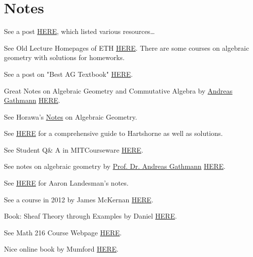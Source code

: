 \section{Notes}

See a post \href{https://math.stackexchange.com/questions/1678780/hartshorne-or-vakils-notes}{HERE}, which listed various resources\dots

See Old Lecture Homepages of ETH \href{https://www2.math.ethz.ch/education/bachelor/lectures.html}{HERE}. There are some courses on algebraic geometry with solutions for homeworks.

See a post on "Best AG Textbook" \href{https://math.stackexchange.com/questions/998/best-algebraic-geometry-text-book-other-than-hartshorne#:~:text=Before%20Hartshorne%27s%20book%20there%20was,and%20the%20sheaf%20of%20differentials.}{HERE}.

Great Notes on Algebraic Geometry and Commutative Algebra by \href{https://math.rptu.de/ags/agag/personen/leitung/gathmann/}{Andreas Gathmann} \href{https://agag-gathmann.math.rptu.de/de/notes.php}{HERE}.

See Horawa's \href{https://people.maths.ox.ac.uk/horawa/notes.html}{Notes} on Algebraic Geometry.

See \href{https://mathbooknotes.fandom.com/wiki/Hartshorne_-_Algebraic_Geometry}{HERE} for a comprehensive guide to Hartshorne as well as solutions.

See Student Q\& A in MITCourseware \href{https://ocw.mit.edu/courses/18-726-algebraic-geometry-spring-2009/pages/student-q-a/}{HERE}.

See notes on algebraic geometry by \href{https://math.rptu.de/en/wgs/agag/people/head/gathmann/}{Prof. Dr. Andreas Gathmann} \href{https://agag-gathmann.math.rptu.de/en/alggeom.php}{HERE}.


See \href{https://people.math.harvard.edu/~landesman/notes.html}{HERE} for Aaron Landesman's notes.

See a course in 2012 by James McKernan \href{https://math.mit.edu/~mckernan/Teaching/11-12/Spring/18.726/18.726.html}{HERE}.

Book: Sheaf Theory through Examples by Daniel \href{https://direct.mit.edu/books/oa-monograph/5460/Sheaf-Theory-through-Examples#}{HERE}.

See Math 216 Course Webpage \href{https://math216.wordpress.com}{HERE}.

Nice online book by Mumford \href{https://www.dam.brown.edu/people/mumford/alg_geom/papers/AGII.pdf}{HERE}.